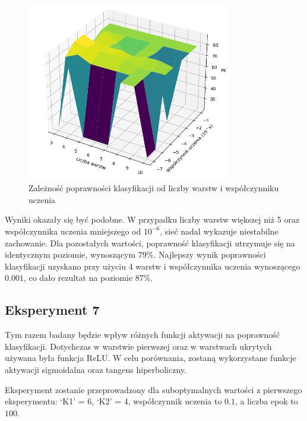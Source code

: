 \documentclass{article}
\begin{document}
\begin{figure}[H]
    \centering
    \includegraphics[width=0.8\textwidth, keepaspectratio]{LR_LAYERS_1500_1000K1K2.PNG}
    \caption{Zależność poprawności klasyfikacji od liczby warstw i współczynniku uczenia}
    \label{fig:lr_layers_3}
\end{figure}

Wyniki okazały się być podobne.
W przypadku liczby warstw większej niż 5 oraz współczynnika uczenia mniejszego od $10^{-6}$, sieć nadal wykazuje niestabilne zachowanie.
Dla pozostałych wartości, poprawność klasyfikacji utrzymuje się na identycznym poziomie, wynoszącym $79\%$.
Najlepszy wynik poprawności klasyfikacji uzyskano przy użyciu 4 warstw i współczynnika uczenia wynoszącego $0.001$, co dało rezultat na poziomie $87\%$.

\newpage
\subsection{Eksperyment 7}
Tym razem badany będzie wpływ różnych funkcji aktywacji na poprawność klasyfikacji.
Dotychczas w warstwie pierwszej oraz w warstwach ukrytych używana była funkcja ReLU.
W celu porównania, zostaną wykorzystane funkcje aktywacji sigmoidalna oraz tangens hiperboliczny.

Eksperyment zostanie przeprowadzony dla suboptymalnych wartości z pierwszego eksperymentu: `K1' = 6, `K2' = 4, współczynnik uczenia to $0.1$, a liczba epok to $100$.
\end{document}
